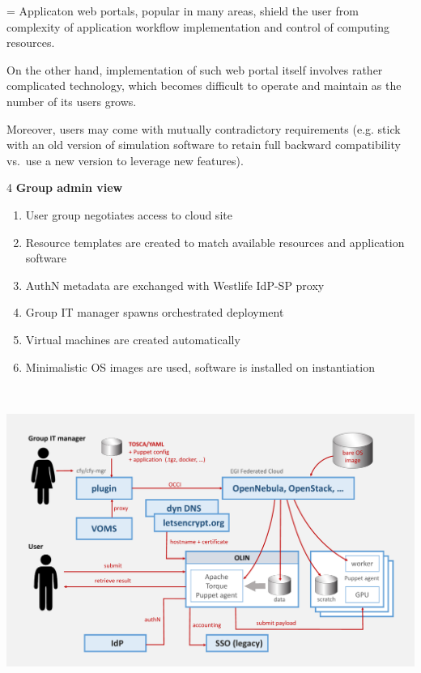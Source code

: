 \documentclass[portrait,final,a0paper,fontscale=0.27]{baposter}
\begin{document}
\begin{poster}
{\parskip=\medskipamount
Applicaton web portals, popular in many areas, \alert{shield the user from complexity}
of application workflow implementation and control of computing resources.

On the other hand, implementation of such web portal itself involves \alert{rather
complicated} technology, which becomes \alert{difficult to operate and maintain} as the
number of its users grows. 

Moreover, users may come with
\alert{mutually contradictory requirements}
(e.g. stick with an old version of simulation software to retain full backward
compatibility vs.\ use a new version to leverage new features).

}

{
\begin{multicols}4
\textbf{Group admin view}
\begin{enumerate}
\item User group negotiates access to cloud site
\item Resource templates are created to match 
available resources and application software
\item AuthN metadata are exchanged with Westlife IdP-SP proxy
\item Group IT manager spawns orchestrated deployment
\item Virtual machines are created automatically
\item Minimalistic OS images are used, software is installed on instantiation
\end{enumerate}

\vfill
\columnbreak
\ 
\vfill
\begin{minipage}[c][20em]{2\columnwidth+1\columnsep}
\centering
\includegraphics[width=\hsize]{schema_export}
\end{minipage}


\end{multicols}}
\end{poster}
\end{document}
